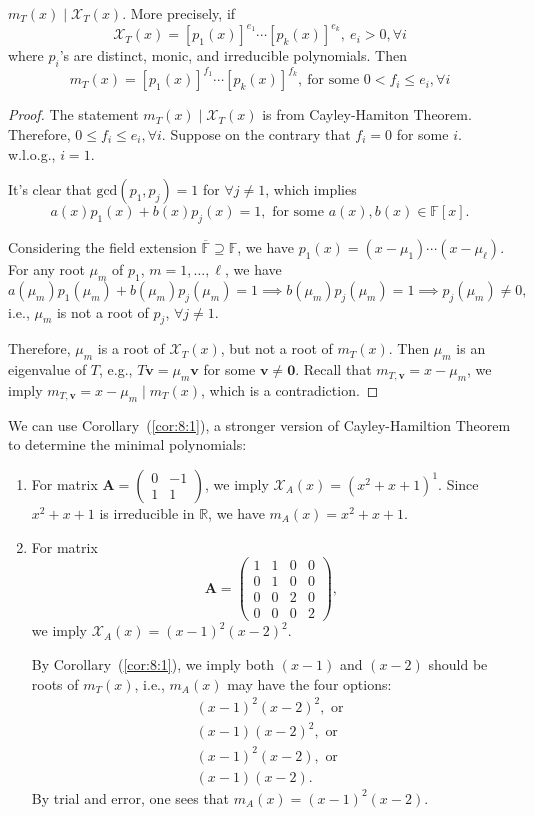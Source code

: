 \begin{corollary}\label{cor:8:1}
$m_T(x)\mid\mathcal{X}_T(x)$.
More precisely,
if
\[
\mathcal{X}_T(x) = [p_1(x)]^{e_1}\cdots[p_k(x)]^{e_k},\ e_i>0,\forall i
\]
where $p_i$'s are distinct, monic, and irreducible polynomials.
Then
\[
m_T(x)=[p_1(x)]^{f_1}\cdots[p_k(x)]^{f_k},\ \text{for some }0<f_i\le e_i,\forall i
\]
\end{corollary}
\begin{proof}
The statement $m_T(x)\mid\mathcal{X}_T(x)$ is from Cayley-Hamiton Theorem.
Therefore, $0\le f_i\le e_i,\forall i$.
Suppose on the contrary that $f_i=0$ for some $i$.
w.l.o.g., $i=1$.

It's clear that $\text{gcd}(p_1,p_j)=1$ for $\forall j\ne 1$, which implies
\[
a(x)p_1(x)+b(x)p_j(x)=1,\text{ for some }a(x),b(x)\in\mathbb{F}[x].
\]

Considering the field extension $\overline{\mathbb{F}}\supseteq\mathbb{F}$, we have
$p_1(x)=(x-\mu_1)\cdots(x-\mu_\ell)$.
For any root $\mu_m$ of $p_1$, $m=1,\dots,\ell$, we have
\[
a(\mu_m)p_1(\mu_m)+b(\mu_m)p_j(\mu_m)=1
\implies
b(\mu_m)p_j(\mu_m)=1
\implies
p_j(\mu_m)\ne0,
\]
i.e., $\mu_m$ is not a root of $p_j$, $\forall j\ne1$.

Therefore, $\mu_m$ is a root of $\mathcal{X}_T(x)$, but not a root of $m_T(x)$.
Then $\mu_m$ is an eigenvalue of $T$, e.g., $T\bm v=\mu_m\bm v$ for some $\bm v\ne\bm0$.
Recall that $m_{T,\bm v}=x-\mu_m$,
we imply $m_{T,\bm v}=x-\mu_m\mid m_T(x)$, which is a contradiction.
\end{proof}





\begin{example}
We can use Corollary~(\ref{cor:8:1}), a stronger version of Cayley-Hamiltion Theorem to determine the minimal polynomials:
\begin{enumerate}
\item
For matrix $\bm A=\begin{pmatrix}
0&-1\\1&1
\end{pmatrix}$, we imply $\mathcal{X}_{A}(x)=(x^2+x+1)^1$.
Since $x^2+x+1$ is irreducible in $\mathbb{R}$, we have $m_A(x)=x^2+x+1$.
\item
For matrix 
\[
\bm A=\begin{pmatrix}
1&1&0&0\\0&1&0&0\\0&0&2&0\\0&0&0&2
\end{pmatrix},
\]
we imply $\mathcal{X}_A(x)=(x-1)^2(x-2)^2$.

By Corollary~(\ref{cor:8:1}), we imply both $(x-1)$ and $(x-2)$ should be roots of $m_T(x)$, i.e., $m_A(x)$ may have the four options:
\begin{align*}
(x-1)^2(x-2)^2,\text{ or }\\
(x-1)(x-2)^2,\text{ or }\\
(x-1)^2(x-2),\text{ or }\\
(x-1)(x-2).
\end{align*}
By trial and error, one sees that $m_A(x) = (x-1)^2(x-2)$.
\end{enumerate}
\end{example}
